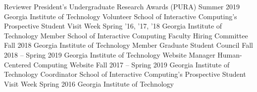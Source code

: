 {\color{black}\fontsize{12pt}{1em}} 

\begin{cventries}
\cventry
    {Reviewer}
    {President's Undergraduate Research Awards (PURA)}
    {Summer 2019}
    {Georgia Institute of Technology}
    {}    
\cventry
    {Volunteer}
    {School of Interactive Computing’s Prospective Student Visit Week}
    {Spring '16, '17, '18}
    {Georgia Institute of Technology}
    {}
\cventry
    {Member}
    {School of Interactive Computing Faculty Hiring Committee}
    {Fall 2018}
    {Georgia Institute of Technology}
    {}
\cventry
    {Member}
    {Graduate Student Council}
    {Fall 2018 -- Spring 2019}
    {Georgia Institute of Technology}
    {}    
\cventry
    {Website Manager}
    {Human-Centered Computing Website}
    {Fall 2017 -- Spring 2019}
    {Georgia Institute of Technology}
    {}    
\cventry
    {Coordinator}
    {School of Interactive Computing's Prospective Student Visit Week}
    {Spring 2016}
    {Georgia Institute of Technology}
    {}
\end{cventries}



